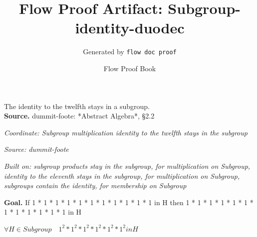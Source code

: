 \documentclass[11pt]{article}
\title{Flow Proof Artifact: Subgroup-identity-duodec}
\author{Generated by \texttt{flow doc proof}}
\date{Flow Proof Book}
\theoremstyle{definition}
\begin{document}
\maketitle
The identity to the twelfth stays in a subgroup.\\[0.5em]
\textbf{Source.} dummit-foote: *Abstract Algebra*, §2.2\\[0.5em]
\bigskip
{}\par
\smallskip\noindent\textit{Coordinate: Subgroup \cdot multiplication \cdot identity to the twelfth stays in the subgroup}\par
\smallskip\noindent\textit{Source: dummit-foote}\par
\smallskip\noindent\textit{Built on: subgroup products stay in the subgroup, for multiplication on Subgroup, identity to the eleventh stays in the subgroup, for multiplication on Subgroup, subgroups contain the identity, for membership on Subgroup}\par
\medskip
\noindent\textbf{Goal.} If 1 * 1 * 1 * 1 * 1 * 1 * 1 * 1 * 1 * 1 * 1 in H then 1 * 1 * 1 * 1 * 1 * 1 * 1 * 1 * 1 * 1 * 1 * 1 in H\par
\noindent$\displaystyle \forall H \in Subgroup\quad 1^{2} * 1^{2} * 1^{2} * 1^{2} * 1^{2} * 1^{2} in H$\par
\medskip
\noindent
\end{document}
